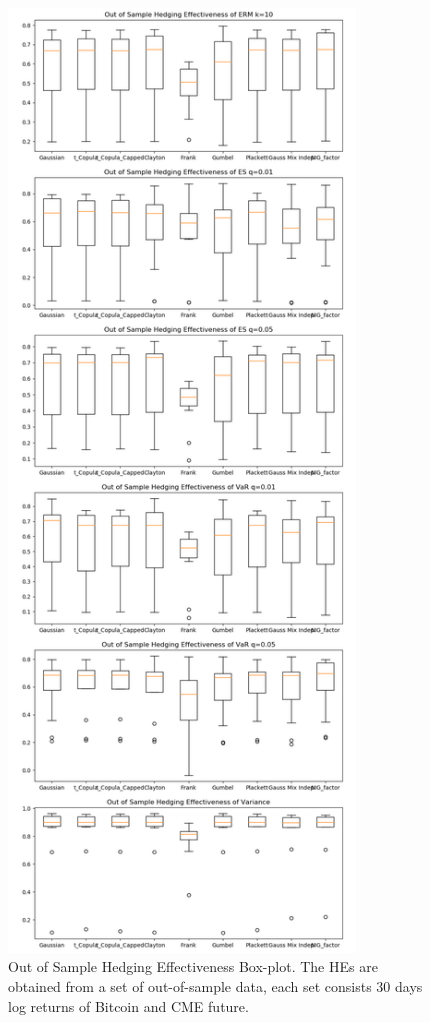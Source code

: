 \begin{figure}[!th]
   \centering
   \includegraphics[height=25cm]{_pics/Out of Sample Hedging Effectiveness.png}
   \caption{Out of Sample Hedging Effectiveness Box-plot.
   The HEs are obtained from a set of out-of-sample data,
   each set consists 30 days log returns of Bitcoin and CME future.
   }
   \label{fig:OOSHE}
\end{figure}

